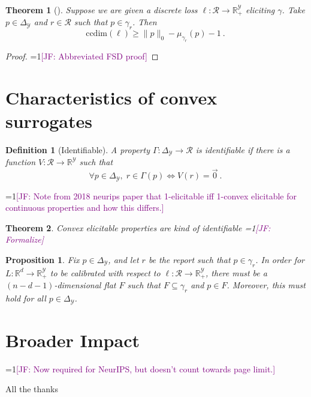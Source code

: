 \documentclass{article}
\newcommand{\Comments}{1}
\newcommand{\mynote}[2]{\ifnum\Comments=1\textcolor{#1}{#2}\fi}
\newcommand{\jessie}[1]{\mynote{purple}{[JF: #1]}}
\newcommand{\reals}{\mathbb{R}}
\newcommand{\simplex}{\Delta_\Y}
\newcommand{\ccdim}{\mathrm{ccdim}}
\newcommand{\R}{\mathcal{R}}
\newcommand{\Y}{\mathcal{Y}}
\newtheorem{theorem}{Theorem}
\newtheorem{proposition}{Proposition}
\newtheorem{definition}{Definition}
\begin{document}
\begin{theorem}[\cite{ramaswamy2016convex}]
	Suppose we are given a discrete loss $\ell:\R \to \reals^\Y_+$ eliciting $\gamma$.
	Take $p \in \simplex$ and $r \in \R$ such that $p \in \gamma_r$.
	Then
	\begin{equation}
	\ccdim(\ell) \geq \|p\|_0 - \mu_{\gamma_r}(p) - 1~.~
	\end{equation}
\end{theorem}
\begin{proof}
	\jessie{Abbreviated FSD proof}
\end{proof}

\section{Characteristics of convex surrogates }
\begin{definition}[Identifiable]
	A property $\Gamma: \simplex \to \R$ is \emph{identifiable} if there is a function $V: \R \to \reals^\Y$ such that 
	\begin{equation*}
	\forall p \in \simplex, \; r \in \Gamma(p) \iff V(r) = \vec 0~.~
	\end{equation*}
\end{definition}

\jessie{Note from 2018 neurips paper that 1-elicitable iff 1-convex elicitable for continuous properties and how this differs.}

\begin{theorem}
	Convex elicitable properties are kind of identifiable \jessie{Formalize}
\end{theorem}

\begin{proposition}
	Fix $p \in \simplex$, and let $r$ be the report such that $p \in \gamma_r$.  
	In order for $L:\reals^d \to \reals^\Y_+$ to be calibrated with respect to $\ell:\R \to \reals^\Y_+$, there must be a $(n - d - 1)$-dimensional flat $F$ such that $F \subseteq \gamma_r$ and $p \in F$.
	Moreover, this must hold for all $p \in \simplex$.
\end{proposition}


\section*{Broader Impact}
\jessie{Now required for NeurIPS, but doesn't count towards page limit.}

\begin{ack}
All the thanks
\end{ack}



\end{document}
